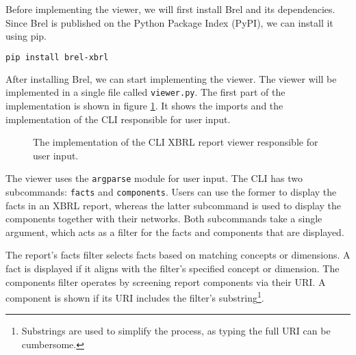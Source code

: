 Before implementing the viewer, we will first install Brel and its dependencies.
Since Brel is published on the Python Package Index (PyPI), we can install it using pip.

\begin{lstlisting}[language=bash]
pip install brel-xbrl
\end{lstlisting}

After installing Brel, we can start implementing the viewer.
The viewer will be implemented in a single file called \texttt{viewer.py}.
The first part of the implementation is shown in figure \ref{fig:viewer_1}.
It shows the imports and the implementation of the CLI responsible for user input.
\begin{figure}[H]
    \centering
    
    \caption{The implementation of the CLI XBRL report viewer responsible for user input.}
    \label{fig:viewer_1}
\end{figure}


The viewer uses the \texttt{argparse} module for user input. 
The CLI has two subcommands: \texttt{facts} and \texttt{components}.
Users can use the former to display the facts in an XBRL report, 
whereas the latter subcommand is used to display the components together with their networks.
Both subcommands take a single argument, which acts as a filter for the facts and components that are displayed.

The report's facts filter selects facts based on matching concepts or dimensions.
A fact is displayed if it aligns with the filter's specified concept or dimension.
The components filter operates by screening report components via their URI.
A component is shown if its URI includes the filter's substring\footnote{Substrings are used to simplify the process, as typing the full URI can be cumbersome.}.

